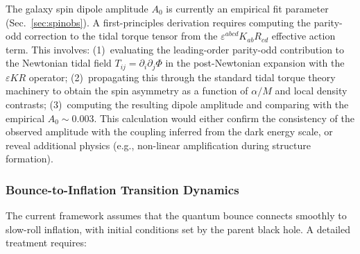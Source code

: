 \documentclass[aps,prd,twocolumn,superscriptaddress,showpacs,preprintnumbers,nofootinbib,longbibliography,floatfix]{revtex4-2}
\begin{document}
The galaxy spin dipole amplitude $A_0$ is currently an empirical fit parameter (Sec.~\ref{sec:spinobs}). A first-principles derivation requires computing the parity-odd correction to the tidal torque tensor from the $\varepsilon^{abcd}K_{ab}R_{cd}$ effective action term. This involves: (1)~evaluating the leading-order parity-odd contribution to the Newtonian tidal field $T_{ij} = \partial_i\partial_j\Phi$ in the post-Newtonian expansion with the $\varepsilon KR$ operator; (2)~propagating this through the standard tidal torque theory machinery to obtain the spin asymmetry as a function of $\alpha/M$ and local density contrasts; (3)~computing the resulting dipole amplitude and comparing with the empirical $A_0\sim 0.003$. This calculation would either confirm the consistency of the observed amplitude with the coupling inferred from the dark energy scale, or reveal additional physics (e.g., non-linear amplification during structure formation).

\subsubsection{Bounce-to-Inflation Transition Dynamics}

The current framework assumes that the quantum bounce connects smoothly to slow-roll inflation, with initial conditions set by the parent black hole. A detailed treatment requires:
\end{document}
